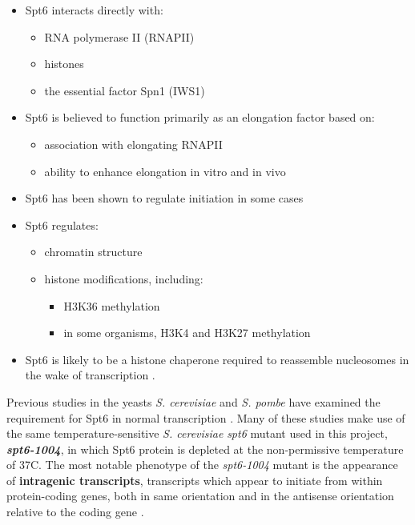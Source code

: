 \documentclass[11pt, a4paper]{article}
\begin{document}
\begin{itemize}[nosep, topsep=.5em]
\item Spt6 interacts directly with:
	\begin{itemize}[nosep]
	\item RNA polymerase II (RNAPII) \cite{close2011, diebold2011, liu2011, sdano2017, sun2010, yoh2007}
	\item histones \cite{bortvin1996, mccullough2015}
	\item the essential factor Spn1 (IWS1) \cite{diebold2010b, li2018, mcdonald2010}
	\end{itemize}
\item Spt6 is believed to function primarily as an elongation factor based on:
	\begin{itemize}[nosep]
	\item association with elongating RNAPII \cite{andrulis2000, ivanovska2011, kaplan2000, mayer2010}
	\item ability to enhance elongation in vitro \cite{endoh2004} and in vivo \cite{ardehali2009}
	\end{itemize}
\item Spt6 has been shown to regulate initiation in some cases \cite{adkins2006, ivanovska2011}
\item Spt6 regulates:
	\begin{itemize}[nosep]
	\item chromatin structure \cite{bortvin1996, degennaro2013, ivanovska2011, jeronimo2015, kaplan2003, perales2013, vanbakel2013}
	\item histone modifications, including:
		\begin{itemize}[nosep]
		\item H3K36 methylation \cite{carrozza2005, chu2006, yoh2008, youdell2008}
		\item in some organisms, H3K4 and H3K27 methylation \cite{begum2012, chen2012, degennaro2013, wang2017, wang2013}
		\end{itemize}
	\end{itemize}
\item Spt6 is likely to be a histone chaperone required to reassemble nucleosomes in the wake of transcription \cite{duina2011}.
\end{itemize}

Previous studies in the yeasts \textit{S. cerevisiae} and \textit{S. pombe} have examined the requirement for Spt6 in normal transcription \cite{cheung2008, degennaro2013, kaplan2003, pathak2018, uwimana2017, vanbakel2013}. Many of these studies make use of the same temperature-sensitive \textit{S. cerevisiae} \textit{spt6} mutant used in this project, \textbf{\textit{spt6-1004}}, in which Spt6 protein is depleted at the non-permissive temperature of 37\textdegree C. The most notable phenotype of the \textit{spt6-1004} mutant is the appearance of \textbf{intragenic transcripts}, transcripts which appear to initiate from within protein-coding genes, both in same orientation and in the antisense orientation relative to the coding gene \cite{cheung2008, degennaro2013, kaplan2003, uwimana2017}.
\end{document}

